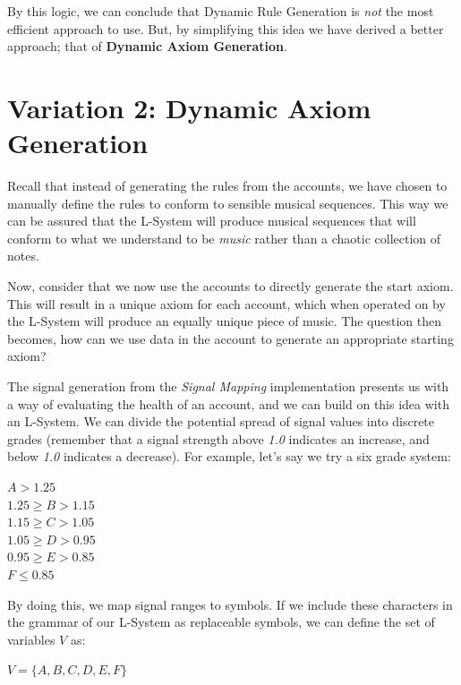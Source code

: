 By this logic, we can conclude that Dynamic Rule Generation is \textit{not} the most efficient approach to use. But, by simplifying this idea we have derived a better approach; that of \textbf{Dynamic Axiom Generation}.

\section{Variation 2: Dynamic Axiom Generation}
Recall that instead of generating the rules from the accounts, we have chosen to manually define the rules to conform to sensible musical sequences. This way we can be assured that the L-System will produce musical sequences that will conform to what we understand to be \textit{music} rather than a chaotic collection of notes.

Now, consider that we now use the accounts to directly generate the start axiom. This will result in a unique axiom for each account, which when operated on by the L-System will produce an equally unique piece of music. The question then becomes, how can we use data in the account to generate an appropriate starting axiom?

The signal generation from the \textit{Signal Mapping} implementation presents us with a way of evaluating the health of an account, and we can build on this idea with an L-System. We can divide the potential spread of signal values into discrete grades (remember that a signal strength above \textit{1.0} indicates an increase, and below \textit{1.0} indicates a decrease). For example, let's say we try a six grade system:

\begin{singlespace}
\begin{formality}
$A > 1.25$\\
$1.25 \geq B > 1.15$\\
$1.15 \geq C > 1.05$\\
$1.05 \geq D > 0.95$\\
$0.95 \geq E > 0.85$\\
$F \leq 0.85$
\end{formality}
\end{singlespace}

By doing this, we map signal ranges to symbols. If we include these characters in the grammar of our L-System as replaceable symbols, we can define the set of variables $V$ as:

\begin{singlespace}
\begin{formality}
$V = \{ A, B, C, D, E, F \}$
\end{formality}
\end{singlespace}

